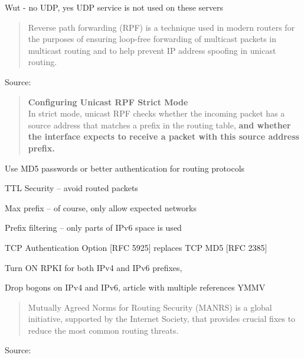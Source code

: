 \documentclass[Screen16to9,17pt]{foils}
\begin{document}
Wut - no UDP, yes UDP service is not used on these servers



\begin{quote}
Reverse path forwarding (RPF) is a technique used in modern routers for the purposes of ensuring loop-free forwarding of multicast packets in multicast routing and to help prevent IP address spoofing in unicast routing.
\end{quote}
Source: 

\begin{quote}
{\bf Configuring Unicast RPF Strict Mode}\\
In strict mode, unicast RPF checks whether the incoming packet has a source address that matches a prefix in the routing table, {\bf and whether the interface expects to receive a packet with this source address prefix.}
\end{quote}







\begin{list2}
\item Use MD5 passwords or better authentication for routing protocols {\myalert}
\item TTL Security -- avoid routed packets
\item Max prefix -- of course, only allow expected networks
\item Prefix filtering -- only parts of IPv6 space is used
\item TCP Authentication Option [RFC 5925] replaces TCP MD5 [RFC 2385]
\item Turn ON RPKI for both IPv4 and IPv6 prefixes, {\myalert} \\
\item Drop bogons on IPv4 and IPv6, article with multiple references YMMV\\
\end{list2}




\begin{quote}
  Mutually Agreed Norms for Routing Security (MANRS) is a global initiative, supported by the Internet Society, that provides crucial fixes to reduce the most common routing threats. ﻿
\end{quote}
Source: {\small{}}
\end{document}

